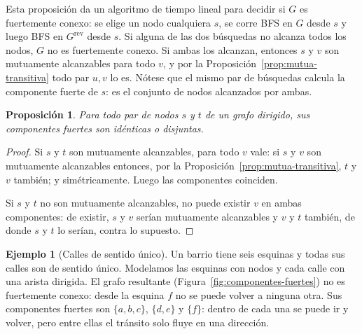 \documentclass[12pt, spanish, oneside, openany]{book}
\theoremstyle{uprightplain}
\newtheorem{proposicion}[teorema]{Proposición}
\theoremstyle{definition}
\newtheorem{ejemplo}[teorema]{Ejemplo}
\theoremstyle{remark}
\theoremstyle{definition}
\begin{document}
Esta proposición da un algoritmo de tiempo lineal para decidir si $G$ es fuertemente conexo: se elige un nodo cualquiera $s$, se corre BFS en $G$ desde $s$ y luego BFS en $G^{\text{rev}}$ desde $s$. Si alguna de las dos búsquedas no alcanza todos los nodos, $G$ no es fuertemente conexo. Si ambas los alcanzan, entonces $s$ y $v$ son mutuamente alcanzables para todo $v$, y por la Proposición~\ref{prop:mutua-transitiva} todo par $u,v$ lo es. Nótese que el mismo par de búsquedas calcula la componente fuerte de $s$: es el conjunto de nodos alcanzados por ambas.

\begin{proposicion}
\label{prop:componentes-fuertes-disjuntas}
Para todo par de nodos $s$ y $t$ de un grafo dirigido, sus componentes fuertes son idénticas o disjuntas.
\end{proposicion}
\begin{proof}
Si $s$ y $t$ son mutuamente alcanzables, para todo $v$ vale: si $s$ y $v$ son mutuamente alcanzables entonces, por la Proposición~\ref{prop:mutua-transitiva}, $t$ y $v$ también; y simétricamente. Luego las componentes coinciden.

Si $s$ y $t$ no son mutuamente alcanzables, no puede existir $v$ en ambas componentes: de existir, $s$ y $v$ serían mutuamente alcanzables y $v$ y $t$ también, de donde $s$ y $t$ lo serían, contra lo supuesto.
\end{proof}

\begin{ejemplo}[Calles de sentido único]
\label{ej:sentido-unico}
Un barrio tiene seis esquinas y todas sus calles son de sentido único. Modelamos las esquinas con nodos y cada calle con una arista dirigida. El grafo resultante (Figura~\ref{fig:componentes-fuertes}) no es fuertemente conexo: desde la esquina $f$ no se puede volver a ninguna otra. Sus componentes fuertes son $\{a,b,c\}$, $\{d,e\}$ y $\{f\}$: dentro de cada una se puede ir y volver, pero entre ellas el tránsito solo fluye en una dirección.
\end{ejemplo}
\end{document}
